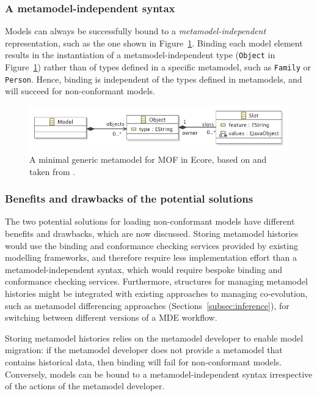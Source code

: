 \subsubsection{A metamodel-independent syntax}
Models can always be successfully bound to a \emph{metamodel-independent} representation, such as the one shown in Figure~\ref{fig:minimal_generic_metamodel}. Binding each model element results in the instantiation of a metamodel-independent type (\texttt{Ob\-je\-ct} in Figure~\ref{fig:minimal_generic_metamodel}) rather than of types defined in a specific metamodel, such as \texttt{Fa\-mi\-ly} or \texttt{Pe\-rs\-on}. Hence, binding is independent of the types defined in metamodels, and will succeed for non-conformant models.

\begin{figure}[htbp]
  \centering
  \includegraphics[width=12cm]{5.Implementation/images/slot_model_design.pdf}
  \caption[A minimal generic metamodel for MOF]{A minimal generic metamodel for MOF in Ecore, based on \cite{mof} and taken from \cite{rose09enhanced}.}
  \label{fig:minimal_generic_metamodel}
\end{figure}
   
\subsubsection{Benefits and drawbacks of the potential solutions}
The two potential solutions for loading non-conformant models have different benefits and drawbacks, which are now discussed. Storing metamodel histories would use the binding and conformance checking services provided by existing modelling frameworks, and therefore require less implementation effort than a metamodel-independent syntax, which would require bespoke binding and conformance checking services. Furthermore, structures for managing metamodel histories might be integrated with existing approaches to managing co-evolution, such as metamodel differencing approaches (Sections~\ref{subsec:inference}), for switching between different versions of a MDE workflow.

Storing metamodel histories relies on the metamodel developer to enable model migration: if the metamodel developer does not provide a metamodel that contains historical data, then binding will fail for non-conformant models. Conversely, models can be bound to a metamodel-independent syntax irrespective of the actions of the metamodel developer.


